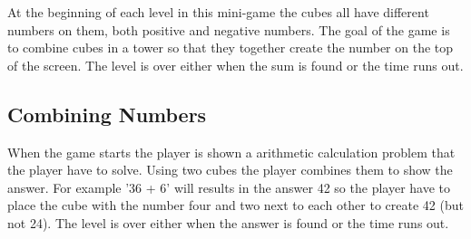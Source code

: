 At the beginning of each level in this mini-game the cubes all have different numbers on them, both positive and negative numbers. The goal of the game is to combine cubes in a tower so that they together create the number on the top of the screen.
The level is over either when the sum is found or the time runs out.



\subsection{Combining Numbers}
	\label{game:combining_numbers}

When the game starts the player is shown a arithmetic calculation problem that the player have to solve. Using two cubes the player combines them to show the answer. For example '36 + 6' will results in the answer 42 so the player have to place the cube with the number four and two next to each other to create 42 (but not 24).
The level is over either when the answer is found or the time runs out.

